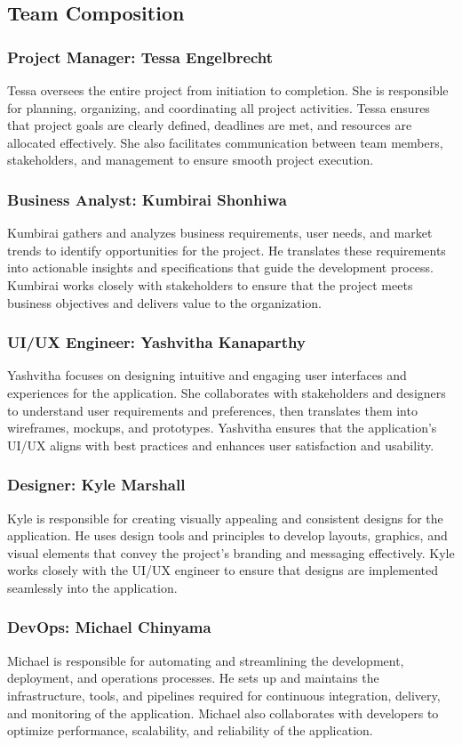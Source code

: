 \documentclass{article}
\begin{document}
\subsection{Team Composition}
\subsubsection{Project Manager: Tessa Engelbrecht}
Tessa oversees the entire project from initiation to completion. She is responsible for planning, organizing, and coordinating all project activities. Tessa ensures that project goals are clearly defined, deadlines are met, and resources are allocated effectively. She also facilitates communication between team members, stakeholders, and management to ensure smooth project execution.
\subsubsection{Business Analyst: Kumbirai Shonhiwa}
Kumbirai gathers and analyzes business requirements, user needs, and market trends to identify opportunities for the project. He translates these requirements into actionable insights and specifications that guide the development process. Kumbirai works closely with stakeholders to ensure that the project meets business objectives and delivers value to the organization.
\subsubsection{UI/UX Engineer: Yashvitha Kanaparthy}
Yashvitha focuses on designing intuitive and engaging user interfaces and experiences for the application. She collaborates with stakeholders and designers to understand user requirements and preferences, then translates them into wireframes, mockups, and prototypes. Yashvitha ensures that the application's UI/UX aligns with best practices and enhances user satisfaction and usability.
\subsubsection{Designer: Kyle Marshall}
Kyle is responsible for creating visually appealing and consistent designs for the application. He uses design tools and principles to develop layouts, graphics, and visual elements that convey the project's branding and messaging effectively. Kyle works closely with the UI/UX engineer to ensure that designs are implemented seamlessly into the application.
\subsubsection{DevOps: Michael Chinyama}
Michael is responsible for automating and streamlining the development, deployment, and operations processes. He sets up and maintains the infrastructure, tools, and pipelines required for continuous integration, delivery, and monitoring of the application. Michael also collaborates with developers to optimize performance, scalability, and reliability of the application.
\end{document}
